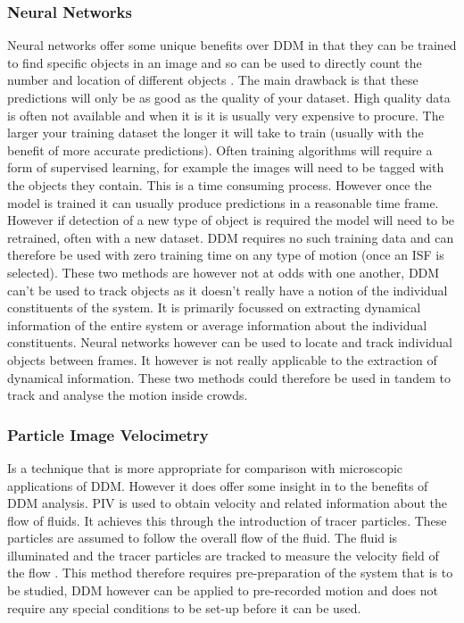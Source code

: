 \documentclass[10pt]{article}
\begin{document}
\subsubsection{Neural Networks}
Neural networks offer some unique benefits over DDM in that they can be trained to find specific objects in an image and so can be used to directly count the number and location of different objects \cite{yolov3}. The main drawback is that these predictions will only be as good as the quality of your dataset. High quality data is often not available and when it is it is usually very expensive to procure. The larger your training dataset the longer it will take to train (usually with the benefit of more accurate predictions). Often training algorithms will require a form of supervised learning, for example the images will need to be tagged with the objects they contain. This is a time consuming process. However once the model is trained it can usually produce predictions in a reasonable time frame. However if detection of a new type of object is required the model will need to be retrained, often with a new dataset. \cite{tensorflow} DDM requires no such training data and can therefore be used with zero training time on any type of motion (once an ISF is selected). These two methods are however not at odds with one another, DDM can't be used to track objects as it doesn't really have a notion of the individual constituents of the system. It is primarily focussed on extracting dynamical information of the entire system or average information about the individual constituents. Neural networks however can be used to locate and track individual objects between frames. It however is not really applicable to the extraction of dynamical information. These two methods could therefore be used in tandem to track and analyse the motion inside crowds.

\subsubsection{Particle Image Velocimetry}
Is a technique that is more appropriate for comparison with microscopic applications of DDM. However it does offer some insight in to the benefits of DDM analysis. PIV is used to obtain velocity and related information about the flow of fluids. It achieves this through the introduction of tracer particles. These particles are assumed to follow the overall flow of the fluid. The fluid is illuminated and the tracer particles are tracked to measure the velocity field of the flow \cite{piv}. This method therefore requires pre-preparation of the system that is to be studied, DDM however can be applied to pre-recorded motion and does not require any special conditions to be set-up before it can be used. 
\end{document}
